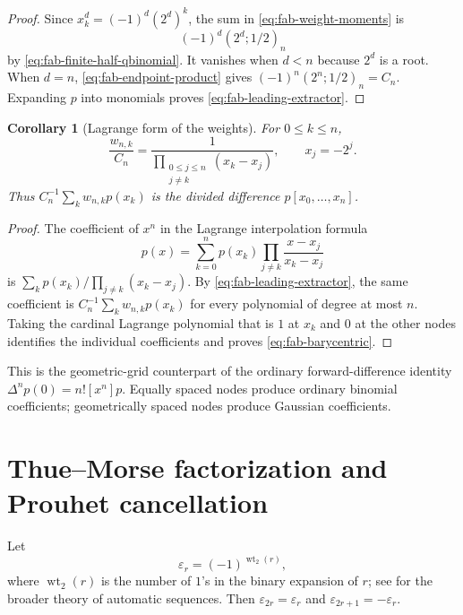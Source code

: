 \documentclass[11pt,oneside,openany]{book}
\newtheorem{corollary}[theorem]{Corollary}
\theoremstyle{definition}
\theoremstyle{remark}
\begin{document}
\begin{proof}
Since $x_k^d=(-1)^d(2^d)^k$, the sum in \eqref{eq:fab-weight-moments} is
\[
 (-1)^d(2^d;1/2)_n
\]
by \eqref{eq:fab-finite-half-qbinomial}.  It vanishes when $d<n$ because $2^d$ is a root.  When $d=n$, \eqref{eq:fab-endpoint-product} gives
\(
 (-1)^n(2^n;1/2)_n=C_n
\).
Expanding $p$ into monomials proves \eqref{eq:fab-leading-extractor}.
\end{proof}

\begin{corollary}[Lagrange form of the weights]\label{cor:fab-barycentric}
For $0\le k\le n$,
\begin{equation}
 \frac{w_{n,k}}{C_n}
 =\frac1{\displaystyle\prod_{\substack{0\le j\le n\\j\ne k}}(x_k-x_j)},
 \qquad x_j=-2^j.
 \label{eq:fab-barycentric}
\end{equation}
Thus $C_n^{-1}\sum_kw_{n,k}p(x_k)$ is the divided difference $p[x_0,\ldots,x_n]$.
\end{corollary}

\begin{proof}
The coefficient of $x^n$ in the Lagrange interpolation formula
\[
 p(x)=\sum_{k=0}^np(x_k)
 \prod_{j\ne k}\frac{x-x_j}{x_k-x_j}
\]
is
\(
 \sum_kp(x_k)/\prod_{j\ne k}(x_k-x_j)
\).
By \eqref{eq:fab-leading-extractor}, the same coefficient is
\(
 C_n^{-1}\sum_kw_{n,k}p(x_k)
\)
for every polynomial of degree at most $n$.  Taking the cardinal Lagrange polynomial that is $1$ at $x_k$ and $0$ at the other nodes identifies the individual coefficients and proves \eqref{eq:fab-barycentric}.
\end{proof}

This is the geometric-grid counterpart of the ordinary forward-difference identity
\(
 \Delta^np(0)=n![x^n]p
\).
Equally spaced nodes produce ordinary binomial coefficients; geometrically spaced nodes produce Gaussian coefficients.

\section{Thue--Morse factorization and Prouhet cancellation}

Let
\begin{equation}
 \varepsilon_r=(-1)^{\operatorname{wt}_2(r)},
 \label{eq:fab-tm-sign}
\end{equation}
where $\operatorname{wt}_2(r)$ is the number of $1$'s in the binary expansion of $r$; see \cite{AlloucheShallit2003} for the broader theory of automatic sequences.  Then
\(
 \varepsilon_{2r}=\varepsilon_r
\)
and
\(
 \varepsilon_{2r+1}=-\varepsilon_r
\).
\end{document}
